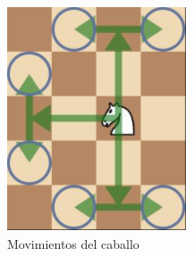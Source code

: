 \documentclass[conference]{IEEEtran}
\begin{document}
    \begin{figure}[h!]
    \centering
    \begin{subfigure}[b]{0.45\linewidth}
    \includegraphics[width=\linewidth]{images/Capturep03.PNG}
    \caption{Movimientos del caballo}
    \label{fig:caballoM}
    \end{subfigure}
    \begin{subfigure}[b]{0.445\linewidth}

\end{subfigure}
\end{figure}
\end{document}

